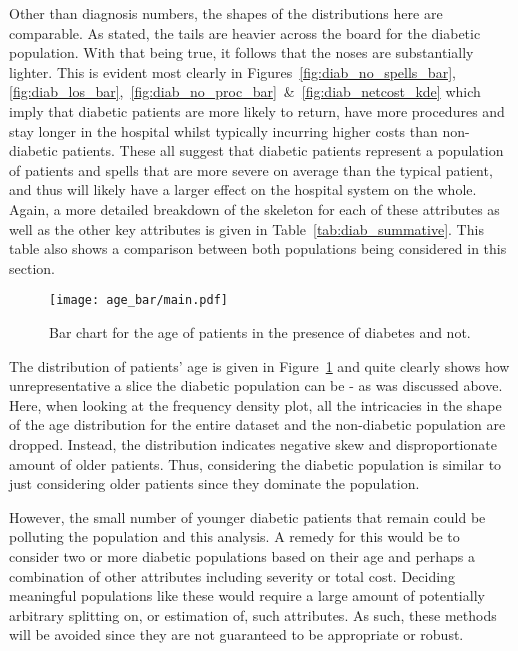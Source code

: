 Other than diagnosis numbers, the shapes of the distributions here are
comparable. As stated, the tails are heavier across the board for the diabetic
population. With that being true, it follows that the noses are substantially
lighter. This is evident most clearly in Figures~\ref{fig:diab_no_spells_bar},~%
\ref{fig:diab_los_bar},~\ref{fig:diab_no_proc_bar}~\&~\ref{fig:diab_netcost_kde}
which imply that diabetic patients are more likely to return, have more
procedures and stay longer in the hospital whilst typically incurring higher
costs than non-diabetic patients. These all suggest that diabetic patients
represent a population of patients and spells that are more severe on average
than the typical patient, and thus will likely have a larger effect on the
hospital system on the whole. Again, a more detailed breakdown of the skeleton
for each of these attributes as well as the other key attributes is given in
Table~\ref{tab:diab_summative}. This table also shows a comparison between both
populations being considered in this section.

\begin{figure}[htbp]
    \centering
    \texttt{[image: age\_bar/main.pdf]}
    \caption{Bar chart for the age of patients in the presence of diabetes and
        not.}%
    \label{fig:diab_age_bar}
\end{figure}

The distribution of patients' age is given in Figure~\ref{fig:diab_age_bar} and
quite clearly shows how unrepresentative a slice the diabetic population can be
\-- as was discussed above. Here, when looking at the frequency density plot,
all the intricacies in the shape of the age distribution for the entire dataset
and the non-diabetic population are dropped. Instead, the distribution indicates
negative skew and disproportionate amount of older patients. Thus, considering
the diabetic population is similar to just considering older patients since they
dominate the population.

However, the small number of younger diabetic patients
that remain could be polluting the population and this analysis. A remedy for
this would be to consider two or more diabetic populations based on their age
and perhaps a combination of other attributes including severity or total cost.
Deciding meaningful populations like these would require a large amount of
potentially arbitrary splitting on, or estimation of, such attributes. As such,
these methods will be avoided since they are not guaranteed to be appropriate or
robust.


